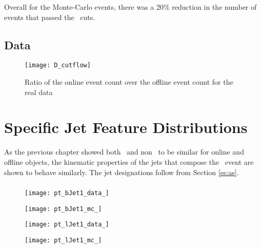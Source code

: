 	Overall for the Monte-Carlo events, there was a 20\% reduction in the number of events that passed the \VBFHBB\, cuts.










	\subsection{Data}
		\begin{figure}[h]
			\centering
			\texttt{[image: D\_cutflow]}
			\caption{Ratio of the online event count over the offline event count for the real data}
			\label{f:cutflowMC}
		\end{figure}




\section{Specific Jet Feature Distributions}

	As the previous chapter showed both \bjets\, and non \bjets\, to be similar for online and offline objects, the kinematic properties of the jets that compose the \VBFHBB\, event are shown to behave similarly. The jet designations follow from Section \ref{es:as}.

		\subsubsection{\pt}

			\begin{figure}[h]
				\centering

				\begin{minipage}[h]{0.48\linewidth}
					\texttt{[image: pt\_bJet1\_data\_]}
				\end{minipage}
				\quad
				\begin{minipage}[h]{0.48\linewidth}
					\texttt{[image: pt\_bJet1\_mc\_]}
				\end{minipage}

				\begin{minipage}[h]{0.48\linewidth}
					\texttt{[image: pt\_lJet1\_data\_]}
				\end{minipage}
				\quad
				\begin{minipage}[h]{0.48\linewidth}
					\texttt{[image: pt\_lJet1\_mc\_]}
				\end{minipage}
				\caption{}
			\end{figure}



